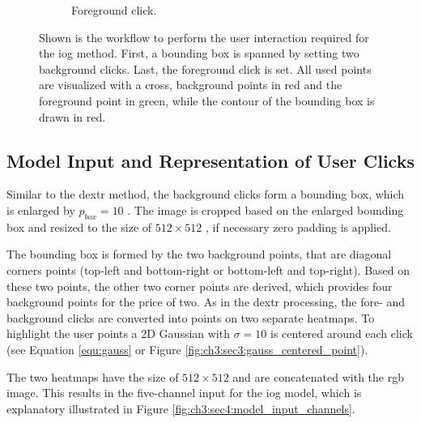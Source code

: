 \begin{figure}
\begin{subfigure}[b]{0.3\textwidth}
		\caption{Foreground click.}
		\label{fig:ch3:sec4:iog_workflow_3}
	\end{subfigure}
	\caption[IOG User Interaction]{
		Shown is the workflow to perform the user interaction required for the \gls{iog} method.
		First, a bounding box is spanned by setting two background clicks.
		Last, the foreground click is set.
		All used points are visualized with a cross, background points in red and the foreground point in green, while the contour of the bounding box is drawn in red.
	} 
	\label{fig:ch3:sec4:iog_user_clicks}
\end{figure}

\subsection{Model Input and Representation of User Clicks}\label{ord:ch3:sec4:subsec2}

Similar to the \gls{dextr} method, the background clicks form a bounding box, which is enlarged by  $p_{{box}} = 10 $ .
The image is cropped based on the enlarged bounding box and resized to the size of $512 \times 512$ , if necessary zero padding is applied.

The bounding box is formed by the two background points, that are diagonal corners points (top-left and bottom-right or bottom-left and top-right).
Based on these two points, the other two corner points are derived, which provides four background points for the price of two.
As in the \gls{dextr} processing, the fore- and background clicks are converted into points on two separate heatmaps.
To highlight the user points a 2D Gaussian with $ \sigma = 10 $ is centered around each click (see Equation \ref{equ:gauss} or Figure \ref{fig:ch3:sec3:gauss_centered_point}).

The two heatmaps have the size of $512 \times 512$  and are concatenated with the \Gls{rgb} image.
This results in the five-channel input for the \gls{iog} model, which is explanatory illustrated in Figure \ref{fig:ch3:sec4:model_input_channels}.

